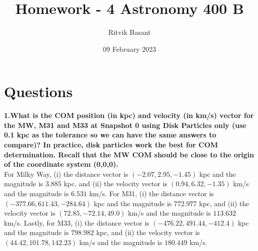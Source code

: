 \documentclass{article}
\title{Homework - 4 Astronomy 400 B}
\author{Ritvik Basant}
\date{09 February 2023}
\begin{document}
\maketitle



\section{Questions}
\textbf{1.What is the COM position (in kpc) and velocity (in km/s) vector for the MW, M31
and M33 at Snapshot 0 using Disk Particles only (use 0.1 kpc as the tolerance so we
can have the same answers to compare)? In practice, disk particles work the best for
COM determination. Recall that the MW COM should be close to the origin of
the coordinate system (0,0,0).}	\\

\noindent For Milky Way, (i) the distance vector is $(-2.07, 2.95, -1.45)$ kpc and the magnitude is $3.885$ kpc, and (ii) the velocity vector is $(0.94, 6.32, -1.35)$ km/s and the magnitude is $6.531$ km/s. For M31, (i) the distance vector is $(-377.66, 611.43, -284.64)$ kpc and the magnitude is $772.977$ kpc, and (ii) the velocity vector is $(72.85, -72.14, 49.0)$ km/s and the magnitude is $113.632$ km/s. Lastly, for M33, (i) the distance vector is $(-476.22,  491.44, -412.4)$ kpc and the magnitude is $798.982$ kpc, and (ii) the velocity vector is $(44.42, 101.78, 142.23)$ km/s and the magnitude is $180.449$ km/s.\\
\end{document}
